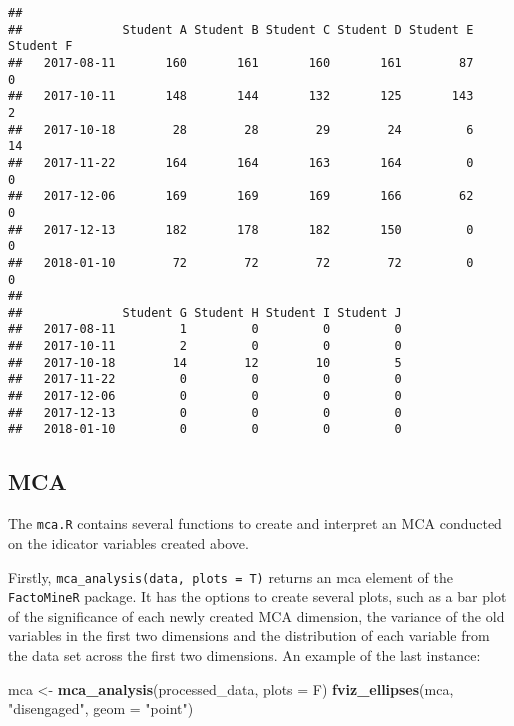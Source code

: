 \documentclass[]{article}
\newenvironment{Shaded}{\begin{snugshade}}{\end{snugshade}}
\newcommand{\KeywordTok}[1]{\textcolor[rgb]{0.13,0.29,0.53}{\textbf{{#1}}}}
\newcommand{\DataTypeTok}[1]{\textcolor[rgb]{0.13,0.29,0.53}{{#1}}}
\newcommand{\StringTok}[1]{\textcolor[rgb]{0.31,0.60,0.02}{{#1}}}
\newcommand{\NormalTok}[1]{{#1}}
\begin{document}
\begin{verbatim}
##             
##              Student A Student B Student C Student D Student E Student F
##   2017-08-11       160       161       160       161        87         0
##   2017-10-11       148       144       132       125       143         2
##   2017-10-18        28        28        29        24         6        14
##   2017-11-22       164       164       163       164         0         0
##   2017-12-06       169       169       169       166        62         0
##   2017-12-13       182       178       182       150         0         0
##   2018-01-10        72        72        72        72         0         0
##             
##              Student G Student H Student I Student J
##   2017-08-11         1         0         0         0
##   2017-10-11         2         0         0         0
##   2017-10-18        14        12        10         5
##   2017-11-22         0         0         0         0
##   2017-12-06         0         0         0         0
##   2017-12-13         0         0         0         0
##   2018-01-10         0         0         0         0
\end{verbatim}

\subsection{MCA}\label{mca}

The \texttt{mca.R} contains several functions to create and interpret an
MCA conducted on the idicator variables created above.

Firstly, \texttt{mca\_analysis(data,\ plots\ =\ T)} returns an mca
element of the \texttt{FactoMineR} package. It has the options to create
several plots, such as a bar plot of the significance of each newly
created MCA dimension, the variance of the old variables in the first
two dimensions and the distribution of each variable from the data set
across the first two dimensions. An example of the last instance:

\begin{Shaded}
\begin{Highlighting}[]
  \NormalTok{mca <-}\StringTok{ }\KeywordTok{mca_analysis}\NormalTok{(processed_data, }\DataTypeTok{plots =} \NormalTok{F)}
  \KeywordTok{fviz_ellipses}\NormalTok{(mca, }\StringTok{"disengaged"}\NormalTok{, }\DataTypeTok{geom =} \StringTok{"point"}\NormalTok{)}
\end{Highlighting}
\end{Shaded}
\end{document}
